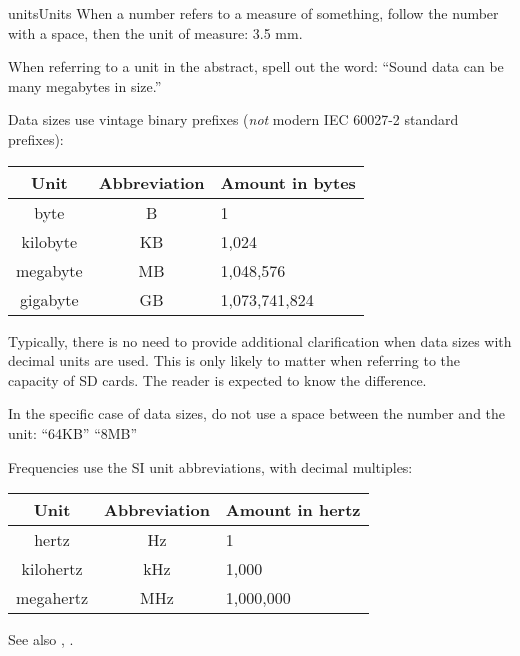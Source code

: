 \begin{sgentry}{units}{Units}
    When a number refers to a measure of something, follow the number with a space, then the unit of measure: 3.5 mm.

    When referring to a unit in the abstract, spell out the word: ``Sound data can be many megabytes in size.''

    Data sizes use vintage binary prefixes (\emph{not} modern IEC 60027-2 standard prefixes):

    \begin{center}
    \begin{tabular}{|c|c|l|}
        \hline
        \textbf{Unit} & \textbf{Abbreviation} & \textbf{Amount in bytes} \\
        \hline
        byte & B & 1 \\
        kilobyte & KB & 1,024 \\
        megabyte & MB & 1,048,576 \\
        gigabyte & GB & 1,073,741,824 \\
        \hline
    \end{tabular}
    \end{center}

    Typically, there is no need to provide additional clarification when data sizes with decimal units are used. This is only likely to matter when referring to the capacity of SD cards. The reader is expected to know the difference.

    In the specific case of data sizes, do not use a space between the number and the unit: ``64KB'' ``8MB''

    Frequencies use the SI unit abbreviations, with decimal multiples:

    \begin{center}
    \begin{tabular}{|c|c|l|}
        \hline
        \textbf{Unit} & \textbf{Abbreviation} & \textbf{Amount in hertz} \\
        \hline
        hertz & Hz & 1 \\
        kilohertz & kHz & 1,000 \\
        megahertz & MHz & 1,000,000 \\
        \hline
    \end{tabular}
    \end{center}

    See also , .
\end{sgentry}

